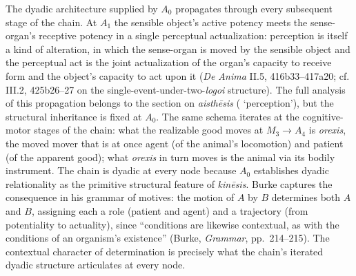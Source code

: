 The dyadic architecture supplied by $A_0$ propagates through every subsequent stage of the chain. At $A_1$ the sensible object's active potency meets the sense-organ's receptive potency in a single perceptual actualization: perception is itself a kind of alteration, in which the sense-organ is moved by the sensible object and the perceptual act is the joint actualization of the organ's capacity to receive form and the object's capacity to act upon it (\textit{De Anima} II.5, 416b33--417a20; cf. III.2, 425b26--27 on the single-event-under-two-\textit{logoi} structure). The full analysis of this propagation belongs to the section on \textit{aisthēsis} ( `perception'), but the structural inheritance is fixed at $A_0$. The same schema iterates at the cognitive-motor stages of the chain: what the realizable good moves at $M_3 \rightarrow A_4$ is \textit{orexis}, the moved mover that is at once agent (of the animal's locomotion) and patient (of the apparent good); what \textit{orexis} in turn moves is the animal via its bodily instrument. The chain is dyadic at every node because $A_0$ establishes dyadic relationality as the primitive structural feature of \textit{kinēsis}. Burke captures the consequence in his grammar of motives: the motion of $A$ by $B$ determines both $A$ and $B$, assigning each a role (patient and agent) and a trajectory (from potentiality to actuality), since ``conditions are likewise contextual, as with the conditions of an organism's existence'' (Burke, \textit{Grammar}, pp.~214--215). The contextual character of determination is precisely what the chain's iterated dyadic structure articulates at every node.

